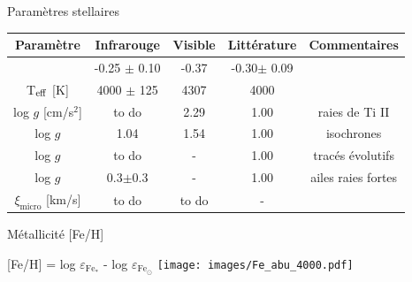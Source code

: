 \documentclass[10pt]{beamer}
\begin{document}
\begin{frame}[fragile]{Paramètres stellaires}
    \begin{table}[h!]
        \begin{center}
            \renewcommand{\arraystretch}{1.5}
            \begin{tabular}{c|ccc|c}
                Paramètre & Infrarouge &Visible& Littérature &Commentaires\\
                \hline
                \arrayrulecolor{red}\hline
                \multicolumn{1}{|c}{$[$Fe/H$]$ [dex]}& -0.25 $\pm$ 0.10 & -0.37 &
                -0.30$\pm$ 0.09&\multicolumn{1}{c|}{}\\
                \arrayrulecolor{red}\hline
                T$_{\rm eff}$ [K] & 4000 $\pm$ 125 &4307 & 4000& \\
    
                log $g$ [cm/s$^2$]& to do & 2.29 & 1.00&raies de Ti II\\
                log $g$  & 1.04 & 1.54 & 1.00 &isochrones\\
                log $g$  & to do & - & 1.00 &tracés évolutifs\\
                log $g$  & 0.3$\pm$0.3 &-& 1.00 &ailes raies fortes\\
                $\xi_{\text{micro}}$ [km/s]& to do & to do & - &\\
            \end{tabular}
        \end{center}
    \end{table}
    \end{frame}

\begin{frame}[fragile]{Métallicité [Fe/H]}
    \begin{center}
        [Fe/H] = log $\varepsilon_{\mathrm{Fe_*}}$ - log $\varepsilon_{\mathrm{Fe_{\odot}}}$
        \texttt{[image: images/Fe\_abu\_4000.pdf]}
    \end{center}
\end{frame}
\end{document}
